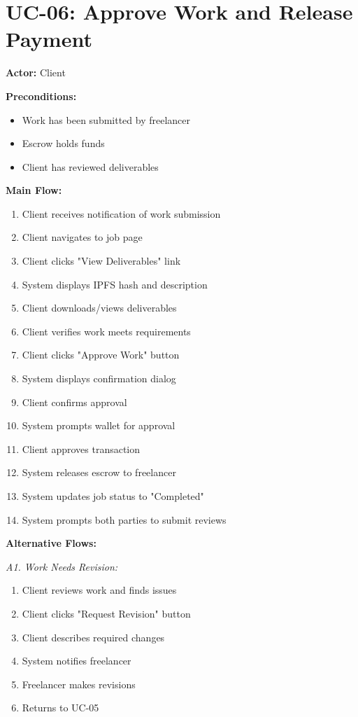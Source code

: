 \documentclass[a4paper,13pt,twoside]{report}
\theoremstyle{definition}
\begin{document}
\section{UC-06: Approve Work and Release Payment}

\textbf{Actor:} Client

\textbf{Preconditions:}
\begin{itemize}
    \item Work has been submitted by freelancer
    \item Escrow holds funds
    \item Client has reviewed deliverables
\end{itemize}

\textbf{Main Flow:}
\begin{enumerate}
    \item Client receives notification of work submission
    \item Client navigates to job page
    \item Client clicks "View Deliverables" link
    \item System displays IPFS hash and description
    \item Client downloads/views deliverables
    \item Client verifies work meets requirements
    \item Client clicks "Approve Work" button
    \item System displays confirmation dialog
    \item Client confirms approval
    \item System prompts wallet for approval
    \item Client approves transaction
    \item System releases escrow to freelancer
    \item System updates job status to "Completed"
    \item System prompts both parties to submit reviews
\end{enumerate}

\textbf{Alternative Flows:}

\textit{A1. Work Needs Revision:}
\begin{enumerate}
    \item Client reviews work and finds issues
    \item Client clicks "Request Revision" button
    \item Client describes required changes
    \item System notifies freelancer
    \item Freelancer makes revisions
    \item Returns to UC-05
\end{enumerate}
\end{document}
